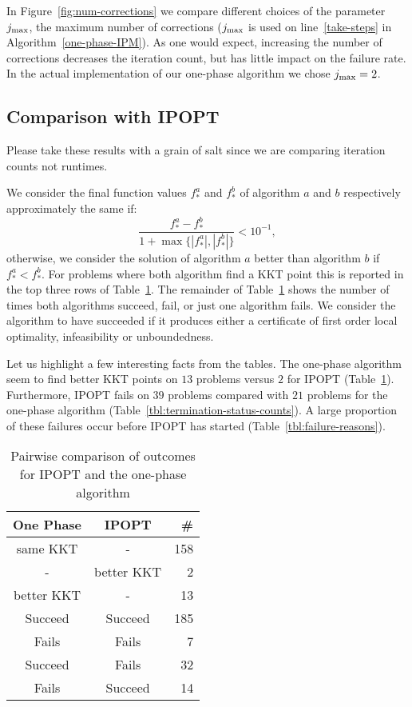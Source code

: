 \documentclass{article}
\begin{document}
In Figure~\ref{fig:num-corrections} we compare different choices of the parameter $j_{\max}$, the maximum number of corrections ($j_{\max}$ is used on line~\ref{take-steps} in Algorithm~\ref{one-phase-IPM}). As one would expect, increasing the number of corrections decreases the iteration count, but has little impact on the failure rate. In the actual implementation of our one-phase algorithm we chose $j_{\max}=2$.




\subsection{Comparison with IPOPT}\label{alg:comparison-IPOPT}

Please take these results with a grain of salt since we are comparing iteration counts not runtimes.



We consider the final function values $f^{a}_{*}$ and $f^{b}_{*}$ of algorithm $a$ and $b$ respectively approximately the same if:
$$
\frac{f^{a}_{*} - f^{b}_{*}}{1 + \max \{ | f^{a}_{*} |, | f^{b}_{*} | \} } < 10^{-1},
$$
otherwise, we consider the solution of algorithm $a$ better than algorithm $b$ if $f^{a}_{*}  < f^{b}_{*}$. For problems where both algorithm find a KKT point this is reported in the top three rows of Table~\ref{tbl:pairwise-outcomes}. The remainder of Table~\ref{tbl:pairwise-outcomes} shows the number of times both algorithms succeed, fail, or just one algorithm fails. We consider the algorithm to have succeeded if it produces either a certificate of first order local optimality, infeasibility or unboundedness. 

Let us highlight a few interesting facts from the tables. The one-phase algorithm seem to find better KKT points on $13$ problems versus $2$ for IPOPT (Table~\ref{tbl:pairwise-outcomes}). Furthermore, IPOPT fails on $39$ problems compared with $21$ problems for the one-phase algorithm (Table~\ref{tbl:termination-status-counts}). A large proportion of these failures occur before IPOPT has started (Table~\ref{tbl:failure-reasons}).

\begin{table}[H]
\caption{Pairwise comparison of outcomes for IPOPT and the one-phase algorithm}\label{tbl:pairwise-outcomes}
\begin{tabular}{ c c r }
  One Phase &  IPOPT &  \# \\
  \hline
same KKT & - & 158  \\
- & better KKT & 2 \\
better KKT & - &  13 \\
\hline
Succeed & Succeed & 185 \\
Fails & Fails & 7 \\
Succeed & Fails &  32 \\
Fails & Succeed & 14 \\
\end{tabular}
\end{table}
\end{document}
